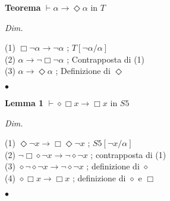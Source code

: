 \documentclass[a4paper, 12pt]{article}
\begin{document}
\begin{flushleft}
\textbf{Teorema}
$\vdash \alpha \rightarrow \Diamond \alpha$ in $T$

\textit{Dim.}

(1) $\Box \neg \alpha \rightarrow \neg \alpha$ ; $T[\neg \alpha/\alpha]$ \\
(2) $\alpha \rightarrow \neg \Box \neg \alpha$ ; Contrapposta di (1) \\
(3) $\alpha \rightarrow \Diamond \alpha$ ; Definizione di $\Diamond$

\begin{flushright}
$\bullet$
\end{flushright}
\end{flushleft}

\begin{flushleft}
\textbf{Lemma 1}
$\vdash \diamond \Box x \rightarrow \Box x$ in $S5$

\textit{Dim.}

(1) $\Diamond \neg x \rightarrow \Box \Diamond \neg x$ ; $S5[\neg x/\alpha]$ \\
(2) $\neg \Box \diamond \neg x \rightarrow \neg \diamond \neg x$ ; contrapposta di (1) \\
(3) $\diamond \neg \diamond \neg x \rightarrow \neg \diamond \neg x$ ; definizione di $\diamond$ \\
(4) $\diamond \Box x \rightarrow \Box x$ ; definizione di $\diamond$ e $\Box$

\begin{flushright}
$\bullet$
\end{flushright}
\end{flushleft}
\end{document}
